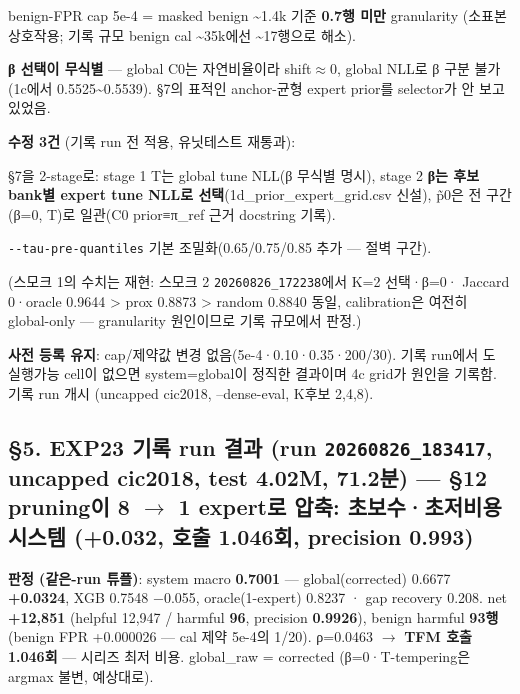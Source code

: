 \par\noindent \textbullet\enspace benign-FPR cap 5e-4 =\allowbreak{} masked benign \textasciitilde{}1.4k 기준 \textbf{0.7행 미만} granularity (소표본 상호작용; 기록 규모 benign cal \textasciitilde{}35k에선 \textasciitilde{}17행으로 해소).


\par\noindent \textbullet\enspace \textbf{β 선택이 무식별} — global C0는 자연비율이라 shift\ensuremath{\approx}0, global NLL로 β 구분 불가(1c에서 0.5525\textasciitilde{}0.5539). §7의 표적인 anchor-균형 expert prior를 selector가 안 보고 있었음.


\textbf{수정 3건} (기록 run 전 적용, 유닛테스트 재통과):

\par\noindent \textbullet\enspace §7을 2-stage로: stage 1 T는 global tune NLL(β 무식별 명시), stage 2 \textbf{β는 후보 bank별 expert tune NLL로 선택}(1d\_\allowbreak{}prior\_\allowbreak{}expert\_\allowbreak{}grid.csv 신설), p̃0은 전 구간 (β=\allowbreak{}0, T)로 일관(C0 prior≡π\_\allowbreak{}ref 근거 docstring 기록).


\par\noindent \textbullet\enspace \texttt{-\allowbreak{}-\allowbreak{}tau-\allowbreak{}pr\allowbreak{}e-\allowbreak{}quanti\allowbreak{}les} 기본 조밀화(0.65/\allowbreak{}0.75/\allowbreak{}0.85 추가 — 절벽 구간).


\par\noindent \textbullet\enspace (스모크 1의 수치는 재현: 스모크 2 \texttt{20260826\allowbreak{}\_\allowbreak{}\allowbreak{}172238}에서 K=\allowbreak{}2 선택·β=\allowbreak{}0· Jaccard 0·oracle 0.9644 > prox 0.8873 > random 0.8840 동일, calibration은 여전히 global-only — granularity 원인이므로 기록 규모에서 판정.)


\textbf{사전 등록 유지}: cap/\allowbreak{}제약값 변경 없음(5e-4·0.10·0.35·200/\allowbreak{}30). 기록 run에서 도 실행가능 cell이 없으면 system=\allowbreak{}global이 정직한 결과이며 4c grid가 원인을 기록함. 기록 run 개시 (uncapped cic2018, --dense-eval, K후보 2,4,8).

\subsection{§5. EXP23 기록 run 결과 (run \texttt{20260826\allowbreak{}\_\allowbreak{}\allowbreak{}183417}, uncapped cic2018, test 4.02M, 71.2분) — \textbf{§12 pruning이 8 \ensuremath{\rightarrow} 1 expert로 압축: 초보수·초저비용 시스템 (+\allowbreak{}0.032, 호출 1.046회, precision 0.993)}}
\textbf{판정 (같은-run 튜플)}: system macro \textbf{0.7001} — global(corrected) 0.6677 \textbf{+\allowbreak{}0.0324}, XGB 0.7548 −0.055, oracle(1-expert) 0.8237 · gap recovery 0.208. net \textbf{+\allowbreak{}12,851} (helpful 12,947 /\allowbreak{} harmful \textbf{96}, precision \textbf{0.9926}), benign harmful \textbf{93행} (benign FPR +\allowbreak{}0.000026 — cal 제약 5e-4의 1/\allowbreak{}20). ρ=\allowbreak{}0.0463  \ensuremath{\rightarrow}  \textbf{TFM 호출 1.046회} — 시리즈 최저 비용. global\_\allowbreak{}raw =\allowbreak{} corrected (β=\allowbreak{}0·T-tempering은 argmax 불변, 예상대로).

